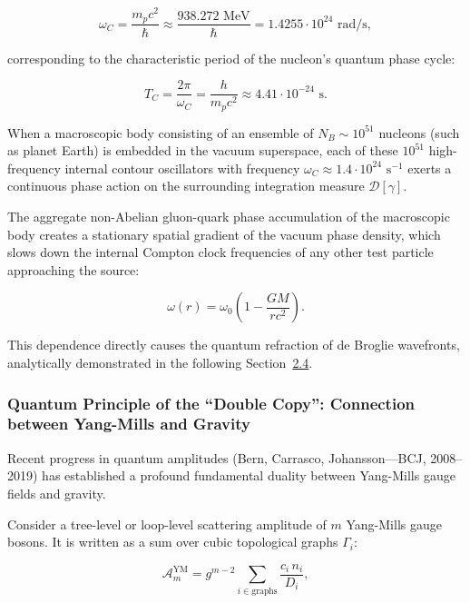 \begin{equation}\label{eq:2.3.50}\tag{2.3.50}
\omega_C = \frac{m_p c^2}{\hbar} \approx \frac{938.272\text{ MeV}}{\hbar} = 1.4255 \cdot 10^{24}\text{ rad/s},
\end{equation}

corresponding to the characteristic period of the nucleon's quantum phase cycle:

\begin{equation}\label{eq:2.3.51}\tag{2.3.51}
T_C = \frac{2\pi}{\omega_C} = \frac{h}{m_p c^2} \approx 4.41 \cdot 10^{-24}\text{ s}.
\end{equation}

When a macroscopic body consisting of an ensemble of $N_B \sim 10^{51}$ nucleons (such as planet Earth) is embedded in the vacuum superspace, each of these $10^{51}$ high-frequency internal contour oscillators with frequency $\omega_C \approx 1.4 \cdot 10^{24}\text{ s}^{-1}$ exerts a continuous phase action on the surrounding integration measure $\mathcal{D}[\gamma]$.

The aggregate non-Abelian gluon-quark phase accumulation of the macroscopic body creates a stationary spatial gradient of the vacuum phase density, which slows down the internal Compton clock frequencies of any other test particle approaching the source:

\begin{equation}\label{eq:2.3.52}\tag{2.3.52}
\omega(r) = \omega_0 \left( 1 - \frac{G M}{r c^2} \right).
\end{equation}

This dependence directly causes the quantum refraction of de Broglie wavefronts, analytically demonstrated in the following Section~\hyperref[sec:2.4]{2.4}.

\subsubsection{Quantum Principle of the ``Double Copy'': Connection between Yang-Mills and Gravity}\label{sec:2.3.9}

Recent progress in quantum amplitudes (Bern, Carrasco, Johansson---BCJ, 2008--2019) has established a profound fundamental duality between Yang-Mills gauge fields and gravity.

Consider a tree-level or loop-level scattering amplitude of $m$ Yang-Mills gauge bosons. It is written as a sum over cubic topological graphs $\Gamma_i$:

\begin{equation}\label{eq:2.3.53}\tag{2.3.53}
\mathcal{A}_{m}^{\text{YM}} = g^{m-2} \sum_{i \in \text{graphs}} \frac{c_i \, n_i}{D_i},
\end{equation}

